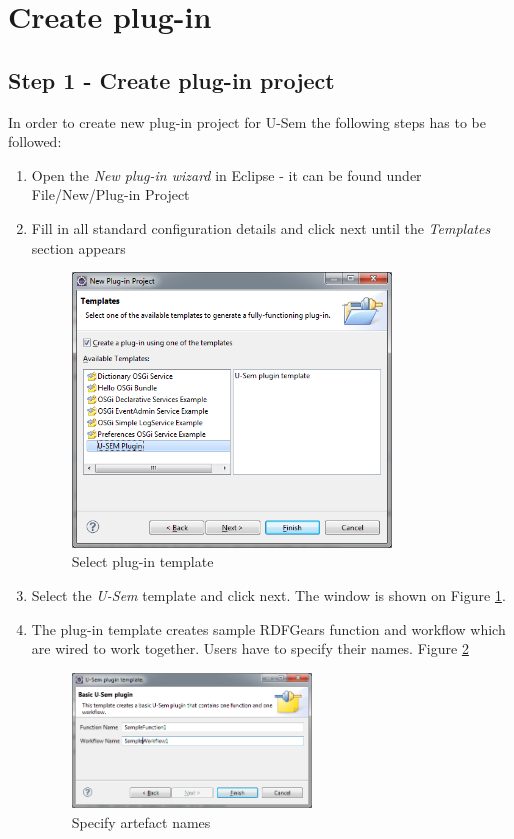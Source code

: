\section{Create plug-in}

\subsection{Step 1 - Create plug-in project}
	In order to create new plug-in project for U-Sem the following steps has to be followed:
	\begin{enumerate}
		\item Open the \textit{New plug-in wizard} in Eclipse - it can be found under File/New/Plug-in Project
		\item Fill in all standard configuration details and click next until the \textit{Templates} section appears

\begin{figure}
  \centering
    \includegraphics[width=0.8\textwidth]{apendix/PluginTutorial/wiz_templ.png}
    \caption{Select plug-in template}
    \label{templ}
\end{figure}

		\item Select the \textit{U-Sem} template and click next. The window is shown on Figure \ref{templ}.
		\item The plug-in template creates sample RDFGears function and workflow which are wired to work together. Users have to specify their names. Figure \ref{art}
		
\begin{figure}
  \centering
    \includegraphics[width=0.6\textwidth]{apendix/PluginTutorial/wiz_art.png}
    \caption{Specify artefact names}
    \label{art}
\end{figure}


\end{enumerate}
